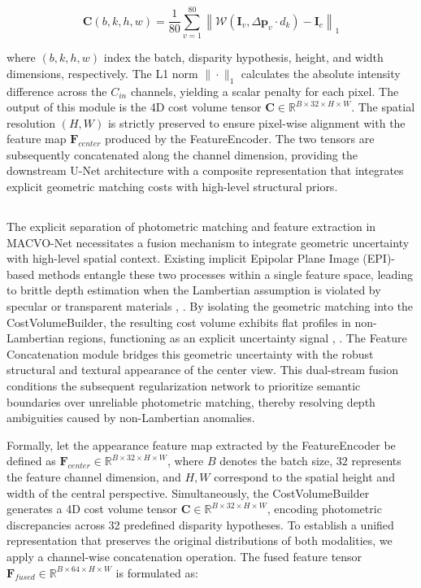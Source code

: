 \documentclass[lettersize,journal]{IEEEtran}
\begin{document}
\begin{equation}
\mathbf{C}(b, k, h, w) = \frac{1}{80} \sum_{v=1}^{80} \left\| \mathcal{W}(\mathbf{I}_v, \Delta \mathbf{p}_v \cdot d_k) - \mathbf{I}_c \right\|_1
\end{equation}

where $(b, k, h, w)$ index the batch, disparity hypothesis, height, and width dimensions, respectively. The L1 norm $\| \cdot \|_1$ calculates the absolute intensity difference across the $C_{in}$ channels, yielding a scalar penalty for each pixel. The output of this module is the 4D cost volume tensor $\mathbf{C} \in \mathbb{R}^{B \times 32 \times H \times W}$. The spatial resolution $(H, W)$ is strictly preserved to ensure pixel-wise alignment with the feature map $\mathbf{F}_{center}$ produced by the FeatureEncoder. The two tensors are subsequently concatenated along the channel dimension, providing the downstream U-Net architecture with a composite representation that integrates explicit geometric matching costs with high-level structural priors.

\subsection{}

The explicit separation of photometric matching and feature extraction in MACVO-Net necessitates a fusion mechanism to integrate geometric uncertainty with high-level spatial context. Existing implicit Epipolar Plane Image (EPI)-based methods entangle these two processes within a single feature space, leading to brittle depth estimation when the Lambertian assumption is violated by specular or transparent materials \cite{wanner2014}, \cite{heber2018}. By isolating the geometric matching into the CostVolumeBuilder, the resulting cost volume exhibits flat profiles in non-Lambertian regions, functioning as an explicit uncertainty signal \cite{li2021}, \cite{zhang2023}. The Feature Concatenation module bridges this geometric uncertainty with the robust structural and textural appearance of the center view. This dual-stream fusion conditions the subsequent regularization network to prioritize semantic boundaries over unreliable photometric matching, thereby resolving depth ambiguities caused by non-Lambertian anomalies.

Formally, let the appearance feature map extracted by the FeatureEncoder be defined as $\mathbf{F}_{center} \in \mathbb{R}^{B \times 32 \times H \times W}$, where $B$ denotes the batch size, $32$ represents the feature channel dimension, and $H, W$ correspond to the spatial height and width of the central perspective. Simultaneously, the CostVolumeBuilder generates a 4D cost volume tensor $\mathbf{C} \in \mathbb{R}^{B \times 32 \times H \times W}$, encoding photometric discrepancies across 32 predefined disparity hypotheses. To establish a unified representation that preserves the original distributions of both modalities, we apply a channel-wise concatenation operation. The fused feature tensor $\mathbf{F}_{fused} \in \mathbb{R}^{B \times 64 \times H \times W}$ is formulated as:
\end{document}
